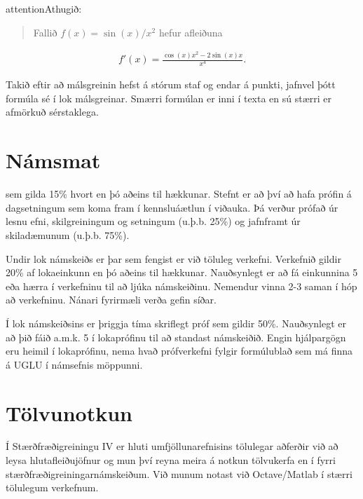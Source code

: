 \documentclass[a4paper,10pt,icelandic]{sphinxmanual}
\begin{document}
\begin{sphinxadmonition}{attention}{Athugið:}\begin{quote}

Fallið \(f(x) = \sin(x)/x^2\) hefur afleiðuna
\end{quote}
\begin{equation*}
\begin{split}f'(x) = \frac{\cos(x)x^2-2\sin(x)x}{x^4}.\end{split}
\end{equation*}\end{sphinxadmonition}

Takið eftir að málsgreinin hefst á stórum staf og endar á punkti, jafnvel þótt formúla sé í lok málsgreinar. Smærri formúlan er inni í texta en sú stærri er afmörkuð sérstaklega.


\section{Námsmat}
\label{\detokenize{umnamskeidid:namsmat}}
 sem gilda 15\% hvort en þó aðeins til hækkunar.
Stefnt er að því að hafa prófin á dagsetningum sem koma fram í kennsluáætlun í viðauka. Þá verður prófað
úr lesnu efni, skilgreiningum og setningum (u.þ.b. 25\%) og jafnframt úr skiladæmunum (u.þ.b. 75\%).

Undir lok námskeiðs er  þar sem fengist er við töluleg verkefni. Verkefnið gildir 20\% af lokaeinkunn en þó aðeins til hækkunar. Nauðsynlegt er að fá einkunnina 5 eða hærra í verkefninu til að ljúka námskeiðinu. Nemendur vinna 2-3 saman í hóp að verkefninu. Nánari fyrirmæli verða gefin síðar.

Í lok námskeiðsins er þriggja tíma skriflegt próf sem gildir 50\%.  Nauðsynlegt er að þið fáið
a.m.k. 5 í lokaprófinu til að standast námskeiðið. Engin hjálpargögn eru
heimil í lokaprófinu, nema hvað prófverkefni fylgir formúlublað sem má
finna á UGLU í námsefnis möppunni.


\section{Tölvunotkun}
\label{\detokenize{umnamskeidid:tolvunotkun}}
Í Stærðfræðigreiningu IV er hluti umfjöllunarefnisins tölulegar aðferðir við að leysa hlutafleiðujöfnur og mun því reyna meira á notkun tölvukerfa en í fyrri stærðfræðigreiningarnámskeiðum. Við munum notast við Octave/Matlab í stærri tölulegum verkefnum.
\end{document}
